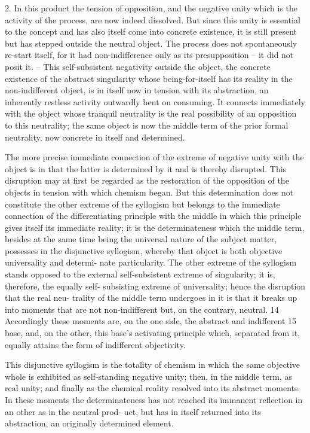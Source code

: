 2. In this product the tension of opposition, and the negative unity
which is the activity of the process, are now indeed dissolved. But since
this unity is essential to the concept and has also itself come into concrete
existence, it is still present but has stepped outside the neutral object. The
process does not spontaneously re-start itself, for it had non-indifference
only as its presupposition – it did not posit it. – This self-subsistent negativity
outside the object, the concrete existence of the abstract singularity whose
being-for-itself has its reality in the non-indifferent object, is in itself now in
tension with its abstraction, an inherently restless activity outwardly bent
on consuming. It connects immediately with the object whose tranquil
neutrality is the real possibility of an opposition to this neutrality; the same
object is now the middle term of the prior formal neutrality, now concrete
in itself and determined.

The more precise immediate connection of the extreme of negative unity
with the object is in that the latter is determined by it and is thereby
disrupted. This disruption may at first be regarded as the restoration of
the opposition of the objects in tension with which chemism began. But
this determination does not constitute the other extreme of the syllogism
but belongs to the immediate connection of the differentiating principle
with the middle in which this principle gives itself its immediate reality;
it is the determinateness which the middle term, besides at the same time
being the universal nature of the subject matter, possesses in the disjunctive
syllogism, whereby that object is both objective universality and determi-
nate particularity. The other extreme of the syllogism stands opposed to the
external self-subsistent extreme of singularity; it is, therefore, the equally self-
subsisting extreme of universality; hence the disruption that the real neu-
trality of the middle term undergoes in it is that it breaks up into moments
that are not non-indifferent but, on the contrary, neutral. 14 Accordingly
these moments are, on the one side, the abstract and indifferent 15 base,
and, on the other, this base's activating principle which, separated from it,
equally attains the form of indifferent objectivity.

This disjunctive syllogism is the totality of chemism in which the same
objective whole is exhibited as self-standing negative unity; then, in the
middle term, as real unity; and finally as the chemical reality resolved
into its abstract moments. In these moments the determinateness has
not reached its immanent reflection in an other as in the neutral prod-
uct, but has in itself returned into its abstraction, an originally determined
element.

